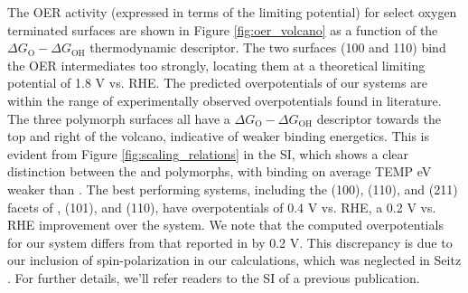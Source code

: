 The OER activity (expressed in terms of the limiting potential) for select oxygen terminated surfaces are shown in Figure \ref{fig:oer_volcano} as a function of the $\Delta G_\mathrm{O} - \Delta G_\mathrm{OH}$ thermodynamic descriptor.
%
The two \rIrOtwo surfaces (100 and 110) bind the OER intermediates too strongly,
locating them at a theoretical limiting potential of \mytilde\num{1.8} V vs. RHE.
%
The predicted overpotentials of our \rIrOtwo systems are within the range of experimentally observed overpotentials found in literature.
%
The three \IrOthree polymorph surfaces all have a $\Delta G_\mathrm{O} - \Delta G_\mathrm{OH}$ descriptor towards the top and right of the volcano, indicative of weaker binding energetics.
%
This is evident from Figure \ref{fig:scaling_relations} in the SI, which shows a clear distinction between the \IrOtwo and \IrOthree polymorphs, with \IrOthree binding on average TEMP eV weaker than \IrOtwo.
%
The best performing systems, including the (100), (110), and (211) facets of \aIrOthree, \bIrOthree (101), and \rIrOthree (110), have overpotentials of \mytilde\num{0.4} V vs. RHE,
a \mytilde\num{0.2} V vs. RHE improvement over the \rIrOtwo system.
%
We note that the computed  overpotentials for our \rIrOtwo system differs from that reported in \cite{Seitz2016} by \mytilde\num{0.2} V.
%
This discrepancy is due to our inclusion of spin-polarization in our  calculations, which was neglected in Seitz .
%
For further details, we'll refer readers to the SI of a previous publication.\cite{Strickler2019}




